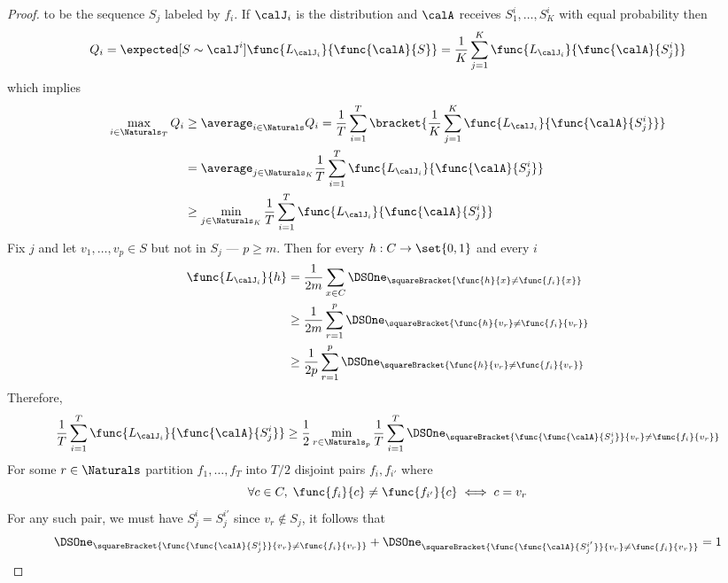\begin{proof}
    to be the sequence \(S_j\) labeled by \(f_i\). If \(\calJ_i\) is the distribution and \(\calA\) receives \(S_1^i , \dots , S_K^i\) with equal probability then 
    \begin{equation*}
        Q_i = \expected[S \sim \calJ^{i}]{\func{L_{\calJ_i}}{\func{\calA}{S}}} = \dfrac{1}{K} \sum_{j = 1}^K \func{L_{\calJ_i}}{\func{\calA}{S^i_j}}
    \end{equation*}
    which implies 
    \begin{align*}
        \max_{i \in \Naturals_T} Q_i &\geq \average_{i \in \Naturals} Q_i = \dfrac{1}{T} \sum_{i = 1}^{T} \bracket{\dfrac{1}{K} \sum_{j = 1}^K \func{L_{\calJ_i}}{\func{\calA}{S^i_j}}}\\
        &= \average_{j \in \Naturals_K} \dfrac{1}{T} \sum_{i = 1}^T \func{L_{\calJ_i}}{\func{\calA}{S^i_j}}\\
        &\geq \min_{j \in \Naturals_K} \dfrac{1}{T} \sum_{i = 1}^T \func{L_{\calJ_i}}{\func{\calA}{S^i_j}}
    \end{align*}
    Fix \(j\) and let \(v_1, \dots , v_p \in S\) but not in \(S_j\) --- \(p \geq m\). Then for every \(h : C \to \set{0,1}\) and every \(i\)
    \begin{align*}
        \func{L_{\calJ_i}}{h} &= \dfrac{1}{2m} \sum_{x \in C} \DSOne_{\squareBracket{\func{h}{x} \neq \func{f_i}{x}}}\\
        &\geq \dfrac{1}{2m} \sum_{r = 1}^p \DSOne_{\squareBracket{\func{h}{v_r} \neq \func{f_i}{v_r}}}\\
        &\geq \dfrac{1}{2p} \sum_{r = 1}^p \DSOne_{\squareBracket{\func{h}{v_r} \neq \func{f_i}{v_r}}}\\
    \end{align*}
    Therefore, 
    \begin{equation*}
        \dfrac{1}{T} \sum_{i = 1}^T \func{L_{\calJ_i}}{\func{\calA}{S^i_j}} \geq \dfrac{1}{2} \min_{r \in \Naturals_p}  \dfrac{1}{T} \sum_{i = 1}^T \DSOne_{\squareBracket{\func{\func{\calA}{S^i_j}}{v_r} \neq \func{f_i}{v_r}}}
    \end{equation*}
    For some \(r \in \Naturals\) partition \(f_1 , \dots , f_T\) into \(T/2\) disjoint pairs \(f_i, f_{i'}\) where 
    \begin{equation*}
        \forall c \in C, \; \func{f_i}{c} \neq \func{f_{i'}}{c} \iff c = v_r
    \end{equation*} 
    For any such pair, we must have \(S^i_j = S^{i'}_j\) since \(v_r \notin S_j\), it follows that 
    \begin{align*}
        &\DSOne_{\squareBracket{\func{\func{\calA}{S^i_j}}{v_r} \neq \func{f_i}{v_r}}}  + \DSOne_{\squareBracket{\func{\func{\calA}{S^{i'}_j}}{v_r} \neq \func{f_i}{v_r}}} = 1 \\

\end{align*}
\end{proof}
